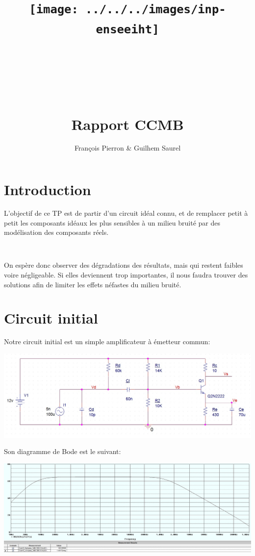\documentclass{article}
\title{\texttt{[image: ../../../images/inp-enseeiht]} \\ ~ \\ ~ \\ ~ \\ ~ \\ Rapport CCMB}
\author{François Pierron \& Guilhem Saurel}
\date{\oldstylenums{\today}}
\begin{document}
\begin{titlepage}
    \setcounter{page}{0}
    \maketitle
    \vfill
    \tableofcontents
    \thispagestyle{empty}
\end{titlepage}

\section*{Introduction}

L’objectif de ce TP est de partir d’un circuit idéal connu, et de remplacer petit à petit les composants idéaux les plus sensibles à un milieu bruité par des modélisation des composants réels.

~

On espère donc observer des dégradations des résultats, mais qui restent faibles voire négligeable. Si elles deviennent trop importantes, il nous faudra trouver des solutions afin de limiter les effets néfastes du milieu bruité.


\section{Circuit initial}
Notre circuit initial est un simple amplificateur à émetteur commun:

\includegraphics[width=\linewidth]{schema_ideal.jpg}

Son diagramme de Bode est le suivant:

\includegraphics[width=\linewidth]{bode_ideal.jpg}
\end{document}
